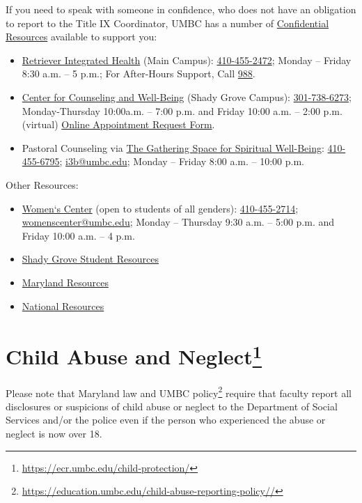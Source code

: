 \documentclass[letter,10pt]{article}
\begin{document}
If you need to speak with someone in confidence, who does not have an obligation to report to the Title IX Coordinator, UMBC has a number of \href{https://ecr.umbc.edu/policy-on-sexual-misconduct-sexual-harassment-and-gender-discrimination/#confidential-resources}{Confidential Resources} available to support you:
\begin{itemize}
    \item \href{https://health.umbc.edu/}{Retriever Integrated Health} (Main Campus): \href{tel:+14104552472}{410-455-2472}; Monday – Friday 8:30 a.m. – 5 p.m.; For After-Hours Support, Call \href{tel:988}{988}.
    \item \href{https://shadygrove.umd.edu/student-affairs/counseling-well-being}{Center for Counseling and Well-Being} (Shady Grove Campus): \href{tel:+13017386273}{301-738-6273}; Monday-Thursday 10:00a.m. – 7:00 p.m. and Friday 10:00 a.m. – 2:00 p.m. (virtual) \href{https://shadygrove.titaniumhwc.com/}{Online Appointment Request Form}.
    \item Pastoral Counseling via \href{https://i3b.umbc.edu/spaces/the-gathering-space-for-spiritual-well-being/}{The Gathering Space for Spiritual Well-Being}: \href{tel:+14104556795}{410-455-6795}; \href{mailto:i3b@umbc.edu}{i3b@umbc.edu}; Monday – Friday 8:00 a.m. – 10:00 p.m.
\end{itemize}

Other Resources:
\begin{itemize}
    \item \href{https://womenscenter.umbc.edu/}{Women`s Center} (open to students of all genders): \href{tel:+14104552714}{410-455-2714}; \href{mailto:womenscenter@umbc.edu}{womenscenter@umbc.edu}; Monday – Thursday 9:30 a.m. – 5:00 p.m. and Friday 10:00 a.m. – 4 p.m.
    \item \href{https://ecr.umbc.edu/shady-grove-title-ix-resources/}{Shady Grove Student Resources}
    \item \href{https://ecr.umbc.edu/maryland-resources/}{Maryland Resources}
    \item \href{https://ecr.umbc.edu/national-resources/}{National Resources}
\end{itemize}

\section*{Child Abuse and Neglect\footnote{\url{https://ecr.umbc.edu/child-protection/}}}
Please note that Maryland law and UMBC policy\footnote{\url{https://education.umbc.edu/child-abuse-reporting-policy//}} require that faculty report all disclosures or suspicions of child abuse or neglect to the Department of Social Services and/or the police even if the person who experienced the abuse or neglect is now over 18.
\end{document}
